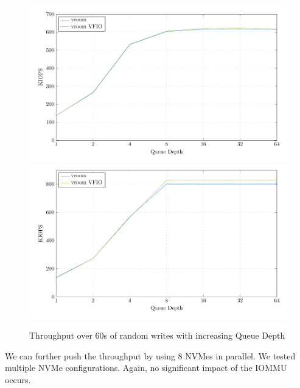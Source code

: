\begin{figure}[H]
  \centering
   {\includegraphics[width=.8\textwidth]{figures/qdnt1_2MiB} \label{fig:qdnt1-2MiB-intel}}
   {\includegraphics[width=.8\textwidth]{figures/qdnt1_2MiB_epyc} \label{fig:qdnt1-2MiB-epyc}}
  \caption{Throughput over 60s of random writes with increasing Queue Depth}
  \label{fig:qdnt1-2MiB}
\end{figure}

We can further push the throughput by using 8 NVMes in parallel. We tested multiple NVMe configurations. Again, no significant impact of the IOMMU occurs.

